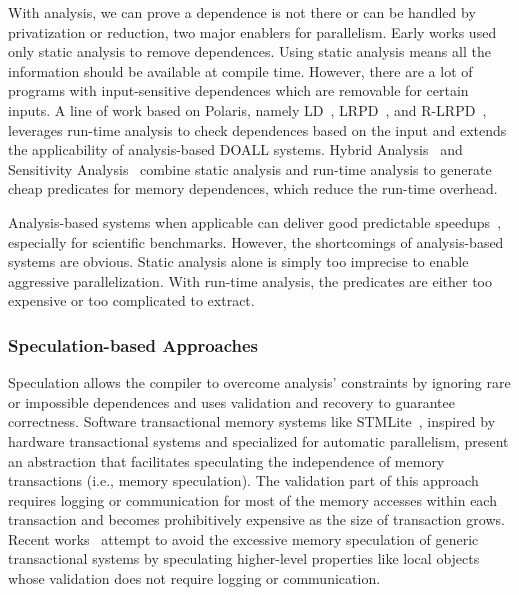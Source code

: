 With analysis, we can prove a dependence is not there or can be handled by
privatization or reduction, two major enablers for parallelism. Early works
used only static analysis to remove dependences. Using static analysis means all
the information should be available at compile time. However, there are a lot of
programs with input-sensitive dependences which are removable for certain
inputs. A line of work based on Polaris, namely LD~\cite{rauchwerger:94:ics},
LRPD~\cite{rauchwerger:99:pds}, and R-LRPD~\cite{dang:02:ipdps}, leverages
run-time analysis to check dependences based on the input and extends the
applicability of analysis-based DOALL systems.  Hybrid
Analysis~\cite{rus:03:hybrid} and Sensitivity Analysis~\cite{Rus:07:ics} combine
static analysis and run-time analysis to generate cheap predicates for memory
dependences, which reduce the run-time overhead.

Analysis-based systems when applicable can deliver good predictable
speedups~\cite{campanoni:2012:iscgo, raman:2008:iscgo, suif:94:stanford,
Rus:07:ics}, especially for scientific benchmarks.
However, the shortcomings of analysis-based systems are obvious. Static
analysis alone is simply too imprecise to enable aggressive parallelization.
With run-time analysis, the predicates are either too expensive or too
complicated to extract.

\subsubsection{Speculation-based Approaches}

Speculation allows the compiler to overcome analysis' constraints by ignoring
rare or impossible dependences and uses validation and recovery to guarantee
correctness. Software transactional memory systems like
STMLite~\cite{mehrara:09:stmlite}, inspired by hardware transactional systems
and specialized for automatic parallelism, present an abstraction that
facilitates speculating the independence of memory transactions (i.e., memory
speculation). The validation part of this approach requires logging or
communication for most of the memory accesses within each transaction and
becomes prohibitively expensive as the size of transaction grows.
Recent works~\cite{ctian:2008:micro,johnson:12:pldi,kim:12:cgo} attempt to avoid
the excessive memory speculation of generic transactional systems by speculating
higher-level properties like local objects whose validation does not require
logging or communication.

